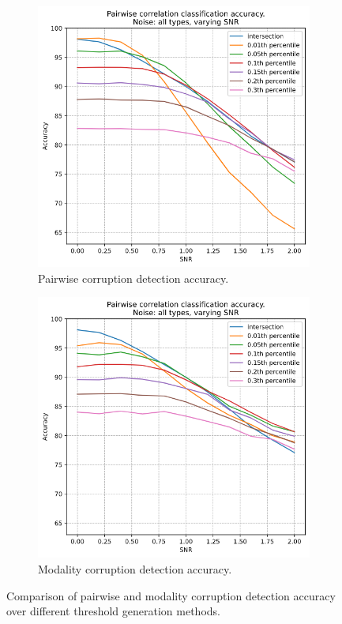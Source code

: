 \begin{figure}[ht]
    \captionsetup{width=.9\linewidth}
    \begin{subfigure}{.5\textwidth}
      \centering\captionsetup{width=.8\linewidth}
      \includegraphics[width=.9\linewidth]{images/pairwise_acc.png}  
      \caption{Pairwise corruption detection accuracy.}
      \label{fig:pairwise_acc}
    \end{subfigure}
    \begin{subfigure}{.5\textwidth}
      \centering\captionsetup{width=.8\linewidth}
      \includegraphics[width=.9\linewidth]{images/modality_acc.png}  
      \caption{Modality corruption detection accuracy.}
      \label{fig:modality_acc}
    \end{subfigure}
    \caption{Comparison of pairwise and modality corruption detection accuracy over different threshold generation methods.}
    \label{fig:threshold_method}
\end{figure}

